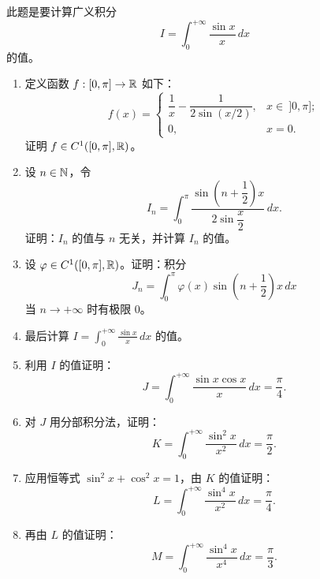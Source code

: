 \begin{exercise}
	\item 此题是要计算广义积分
	\[I=\int_0^{+\infty}\frac{\sin x}{x}\,dx\]
	的值。

	\begin{enumerate}[label=\arabic*)]
		\item 定义函数 $f:[0,\pi]\to\mathbb{R}$ 如下：
		\[f(x)=\begin{cases} \dfrac{1}{x}-\dfrac{1}{2\sin(x/2)}, & x\in\ ]0,\pi];\\[1ex] 0, & x=0. \end{cases}\]
		证明 $f\in C^1([0,\pi],\mathbb{R})$。
		\item 设 $n\in\mathbb{N}$，令
		\[I_n=\int_0^{\pi}\frac{\sin\left(n+\dfrac{1}{2}\right)x}{2\sin\dfrac{x}{2}}\,dx.\]
		证明：$I_n$ 的值与 $n$ 无关，并计算 $I_n$ 的值。
		\item 设 $\varphi\in C^1([0,\pi],\mathbb{R})$。证明：积分
		\[J_n=\int_0^{\pi}\varphi(x)\sin\left(n+\frac{1}{2}\right)x\,dx\]
		当 $n\to+\infty$ 时有极限 $0$。
		\item 最后计算 $I=\displaystyle\int_0^{+\infty}\frac{\sin x}{x}\,dx$ 的值。
		\item 利用 $I$ 的值证明：
		\[J=\int_0^{+\infty}\frac{\sin x\cos x}{x}\,dx=\frac{\pi}{4}.\]
		\item 对 $J$ 用分部积分法，证明：
		\[K=\int_0^{+\infty}\frac{\sin^2x}{x^2}\,dx=\frac{\pi}{2}.\]
		\item 应用恒等式 $\sin^2x+\cos^2x=1$，由 $K$ 的值证明：
		\[L=\int_0^{+\infty}\frac{\sin^4x}{x^2}\,dx=\frac{\pi}{4}.\]
		\item 再由 $L$ 的值证明：
		\[M=\int_0^{+\infty}\frac{\sin^4x}{x^4}\,dx=\frac{\pi}{3}.\]
	\end{enumerate}
\end{exercise}
